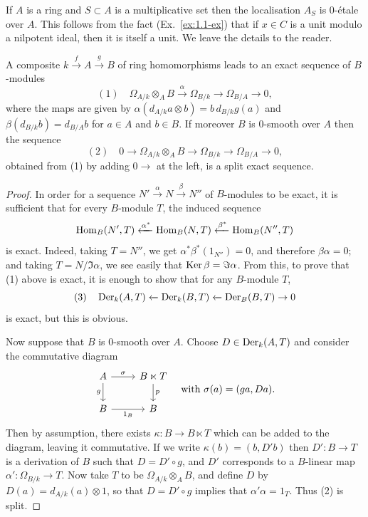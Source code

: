 If $A$ is a ring and $S \subset A$ is a multiplicative set then the localisation $A_S$
is 0-\'etale over $A$. This follows from the fact (Ex.~\ref{ex:1.1-ex}) that if $x \in C$ is a unit
modulo a nilpotent ideal, then it is itself a unit. We leave the details to the
reader.

\begin{theorem}\label{thm:25.1}
A composite $k \xrightarrow{f} A \xrightarrow{g} B$ of ring homomorphisms leads to an
exact sequence of $B$-modules
\[
  (1) \quad \Omega_{A/k} \otimes_A B \xrightarrow{\alpha} \Omega_{B/k} \to \Omega_{B/A} \to 0,
\]
where the maps are given by $\alpha(d_{A/k}a \otimes b) = b\,d_{B/k}g(a)$ and
$\beta(d_{B/k}b) = d_{B/A}b$ for $a \in A$ and $b \in B$. If moreover $B$ is 0-smooth over
$A$ then the sequence
\[
  (2) \quad 0 \to \Omega_{A/k} \otimes_A B \to \Omega_{B/k} \to \Omega_{B/A} \to 0,
\]
obtained from (1) by adding $0 \to$ at the left, is a split exact sequence.
\end{theorem}

\begin{proof}
In order for a sequence $N' \xrightarrow{\alpha} N \xrightarrow{\beta} N''$ of $B$-modules to be
exact, it is sufficient that for every $B$-module $T$, the induced sequence
\[
  \operatorname{Hom}_B(N', T) \xleftarrow{\alpha^*} \operatorname{Hom}_B(N, T) \xleftarrow{\beta^*} \operatorname{Hom}_B(N'', T)
\]
is exact. Indeed, taking $T = N''$, we get $\alpha^*\beta^*(1_{N''}) = 0$, and therefore
$\beta\alpha = 0$; and taking $T = N/\Im \alpha$, we see easily that $\operatorname{Ker} \beta = \Im \alpha$. From
this, to prove that (1) above is exact, it is enough to show that for any $B$-module
$T$,
\[
  (3) \quad \operatorname{Der}_k(A, T) \xleftarrow{} \operatorname{Der}_k(B, T) \xleftarrow{} \operatorname{Der}_B(B, T) \to 0
\]
is exact, but this is obvious.

Now suppose that $B$ is 0-smooth over $A$. Choose $D \in \operatorname{Der}_k(A, T)$ and consider
the commutative diagram
\[
\begin{tikzcd}
A \arrow[r, "\sigma"] \arrow[d, "g"'] & B \ltimes T \arrow[d, "p"] \\
B \arrow[r, "1_B"'] & B
\end{tikzcd}
\quad \text{with } \sigma(a) = (ga, Da).
\]
Then by assumption, there exists $\kappa\colon B \to B \ltimes T$ which can be added to
the diagram, leaving it commutative. If we write $\kappa(b) = (b, D'b)$ then
$D'\colon B \to T$ is a derivation of $B$ such that $D = D' \circ g$, and $D'$ corresponds to a
$B$-linear map $\alpha'\colon \Omega_{B/k} \to T$. Now take $T$ to be $\Omega_{A/k} \otimes_A B$,
and define $D$ by $D(a) = d_{A/k}(a) \otimes 1$, so that $D = D' \circ g$ implies that
$\alpha'\alpha = 1_T$. Thus (2) is split.
\end{proof}

